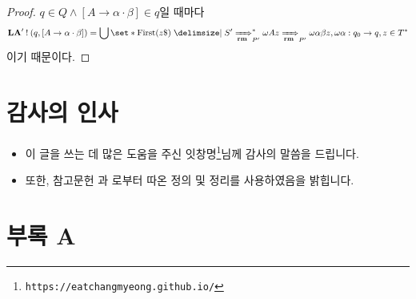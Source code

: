 \documentclass[12pt]{paper}
\theoremstyle{definition}
\begin{document}
\begin{proof}
$q \in Q \land [ A \to \alpha \cdot \beta ] \in q$일 때마다
\begin{align}
\mathbf{LA}^\prime \mathbin{!} ( q , [ A \to \alpha \cdot \beta ] ) = \bigcup \set*{ \mathrm{First} ( z \$ ) \mid S^\prime \xRightarrow[\mathbf{rm}]{}_{P^\prime}^\ast \omega A z \xRightarrow[\mathbf{rm}]{}_{P^\prime} \omega \alpha \beta z , \omega \alpha : q_0 \to q , z \in T^\ast }
\end{align}
이기 때문이다.
\end{proof}

\section*{감사의 인사}
\begin{itemize}
\item 이 글을 쓰는 데 많은 도움을 주신 잇창명\footnote{\texttt{https://eatchangmyeong.github.io/}}님께 감사의 말씀을 드립니다.
\item 또한, 참고문헌 \cite{DeRemer1982}과 \cite{SemanOh2010}로부터 따온 정의 및 정리를 사용하였음을 밝힙니다.
\end{itemize}

\printbibliography[title={참고문헌}]

\newpage

\section*{부록 A}
\end{document}
